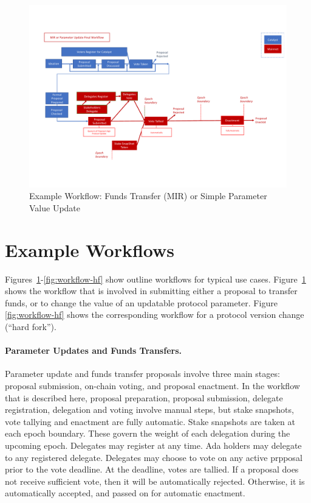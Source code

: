 \begin{figure}
  \includegraphics[trim=0 90 0 80,clip,width=\textwidth]{Workflow1}
  \caption{Example Workflow: Funds Transfer (MIR) or Simple Parameter Value Update}
  \label{fig:workflow-mir}
\end{figure}

\section{Example Workflows}
\label{sec:workflows}

Figures~\ref{fig:workflow-mir}-\ref{fig:workflow-hf} show outline workflows for
typical use cases.  Figure~\ref{fig:workflow-mir} shows the workflow that is
involved in submitting either a proposal to transfer funds, or to change the
value of an updatable protocol parameter.  Figure \ref{fig:workflow-hf} shows
the corresponding workflow for a protocol version change (``hard fork'').

\paragraph{Parameter Updates and Funds Transfers.}  Parameter update and funds transfer proposals involve three main stages:
proposal submission, on-chain voting, and proposal enactment.  In the workflow that is described
here, proposal preparation, proposal submission, delegate registration,
delegation and voting involve manual steps, but stake snapshots, vote tallying
and enactment are fully automatic.  Stake snapshots are taken at each epoch boundary.
These govern the weight of each delegation during the upcoming epoch.
%
Delegates may register at any time.  Ada holders may delegate to any registered delegate.
Delegates may choose to vote on any active prpposal prior to the vote deadline.
At the deadline, votes are tallied.  If a proposal does not receive sufficient vote, then
it will be automatically rejected.  Otherwise, it is automatically accepted, and passed on for
automatic enactment.

